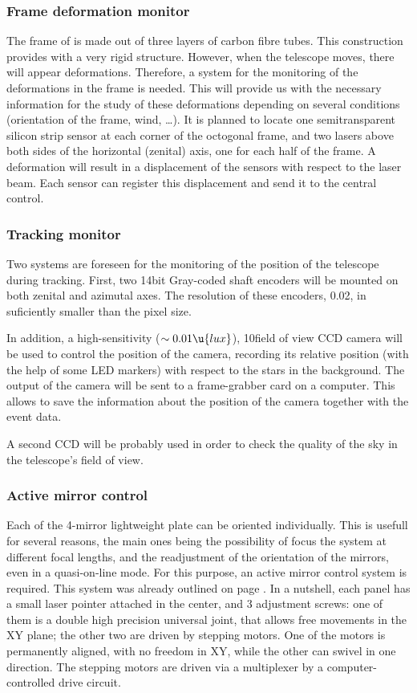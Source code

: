 \subsubsection{Frame deformation monitor}
%
The frame of \MAGIC is made out of three layers of carbon fibre tubes.
This construction provides \MAGIC with a very rigid structure.
However, when the telescope moves, there will appear deformations.
Therefore, a system for the monitoring of the deformations in the
frame is needed.  This will provide us with the necessary information
for the study of these deformations depending on several conditions
(orientation of the frame, wind, \ldots). It is planned
\cite{MAGIC:DR} to locate one semitransparent silicon strip sensor at
each corner of the octogonal frame, and two lasers above both sides of
the horizontal (zenital) axis, one for each half of the frame. A
deformation will result in a displacement of the sensors with respect
to the laser beam.  Each sensor can register this displacement and
send it to the central control.

\subsubsection{Tracking monitor}
%
Two systems are foreseen for the monitoring of the position of the
telescope during tracking.  First, two 14bit Gray-coded shaft encoders
will be mounted on both zenital and azimutal axes. The resolution of
these encoders, 0.02\deg, in suficiently smaller than the pixel size.

In addition, a high-sensitivity ($\sim 0.01\u{lux}$), 10\deg field of
view CCD camera will be used to control the position of the camera,
recording its relative position (with the help of some LED markers)
with respect to the stars in the background.  The output of the camera
will be sent to a frame-grabber card on a computer. This allows to
save the information about the position of the camera together with
the event data.

A second CCD will be probably used in order to check the quality of
the sky in the telescope's field of view.

\subsubsection{Active mirror control}
%
Each of the 4-mirror lightweight plate can be oriented individually.
This is usefull for several reasons, the main ones being the
possibility of focus the system at different focal lengths, and the
readjustment of the orientation of the mirrors, even in a
quasi-on-line mode.  For this purpose, an active mirror control system
is required. This system was already outlined on page
\pageref{label:amcs}. In a nutshell, each panel has a small laser
pointer attached in the center, and 3 adjustment screws: one of them
is a double high precision universal joint, that allows free movements
in the XY plane; the other two are driven by stepping motors. One of
the motors is permanently aligned, with no freedom in XY, while the
other can swivel in one direction. The stepping motors are driven via
a multiplexer by a computer-controlled drive circuit.

